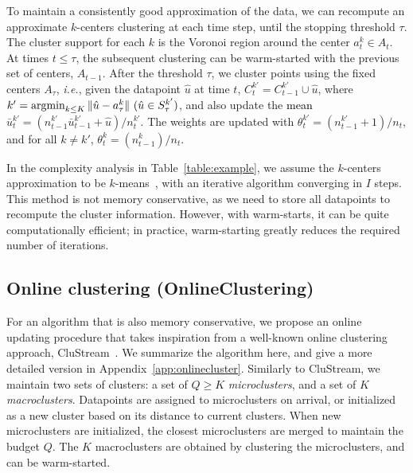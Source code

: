\documentclass[12pt]{article}
\newcommand{\ie}{{\it i.e.}}
\newcommand{\argmin}{\mathop{\rm argmin}}
\newcommand{\RC}[1]{\textcolor{black}{#1}}
\newcommand{\RC}[1]{\textcolor{blue}{#1}}
\begin{document}
\else 
To maintain a consistently good approximation of the data, we can recompute an approximate $k$-centers clustering at each time step, until the stopping threshold $\tau$.
The cluster support for each $k$ is the Voronoi region around the center $a_t^k \in A_t$.
At times $t\leq \tau $, the subsequent clustering can be warm-started with the previous set of centers, $A_{t-1}$. 
After the threshold $\tau$, we cluster points using the fixed centers $A_\tau$,
\ie, given the datapoint $\hat{u}$ at time $t$,
$C_t^{k'} = C_{t-1}^{k'} \cup \hat{u}$, where $k'=\argmin_{k\leq K} \|\hat{u} - a^k_\tau\|~(\hat{u} \in S^{k'}_\tau)$, and also update the \RC{mean} $\bar{u}^{k'}_t = (n^{k'}_{t-1}\bar{u}^{k'}_{t-1} + \hat{u})/n^{k'}_t$. The weights are updated with $\theta^{k'}_{t} = (n^{k'}_{t-1} + 1)/n_{t}$, and for all $k \neq k'$, $\theta^{k}_{t} = (n^{k}_{t-1})/n_{t}$. 
\fi 

In the complexity analysis in Table~\ref{table:example}, we assume the $k$-centers approximation to be $k$-means~\cite{kmeans}, with an iterative algorithm converging in $I$ steps. 
This method is not memory conservative, as we need to store all datapoints to recompute the cluster information. 
However, with warm-starts, it can be quite computationally efficient; in practice, warm-starting greatly reduces the required number of iterations.


\subsection{Online clustering (OnlineClustering)}
\label{sec:clustream}
For an algorithm that is also memory conservative, we propose an online updating procedure that takes inspiration from \ifpreprint a well-known online clustering approach, \fi CluStream~\cite{clustream}.
\ifpreprint
We summarize the algorithm here, and give a more detailed version in Appendix~\ref{app:onlinecluster}.
\fi
Similarly to CluStream, we maintain two sets of clusters: a set of $Q \geq K$ {\it microclusters}, and a set of $K$ {\it macroclusters}.
Datapoints are assigned to microclusters on arrival, or initialized as a new cluster based on its distance to current clusters. When new microclusters are initialized, the closest microclusters are merged to maintain the budget $Q$. The $K$ macroclusters are obtained by clustering the microclusters, and can be warm-started. 
\end{document}
